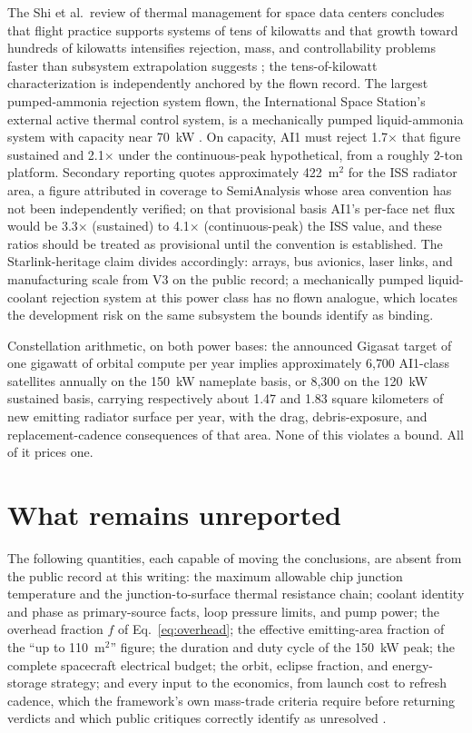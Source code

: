 \documentclass[11pt]{article}
\begin{document}
The Shi et al.\ review of thermal management for space data centers concludes that flight practice supports systems of tens of kilowatts and that growth toward hundreds of kilowatts intensifies rejection, mass, and controllability problems faster than subsystem extrapolation suggests \cite{shi2026}; the tens-of-kilowatt characterization is independently anchored by the flown record. The largest pumped-ammonia rejection system flown, the International Space Station's external active thermal control system, is a mechanically pumped liquid-ammonia system with capacity near 70~kW \cite{nasaiss}. On capacity, AI1 must reject 1.7$\times$ that figure sustained and 2.1$\times$ under the continuous-peak hypothetical, from a roughly 2-ton platform. Secondary reporting quotes approximately 422~m$^{2}$ for the ISS radiator area, a figure attributed in coverage to SemiAnalysis whose area convention has not been independently verified; on that provisional basis AI1's per-face net flux would be 3.3$\times$ (sustained) to 4.1$\times$ (continuous-peak) the ISS value, and these ratios should be treated as provisional until the convention is established. The Starlink-heritage claim \cite{dcd2026} divides accordingly: arrays, bus avionics, laser links, and manufacturing scale from V3 on the public record; a mechanically pumped liquid-coolant rejection system at this power class has no flown analogue, which locates the development risk on the same subsystem the bounds identify as binding.

Constellation arithmetic, on both power bases: the announced Gigasat target of one gigawatt of orbital compute per year \cite{tomsgigasat2026} implies approximately 6{,}700 AI1-class satellites annually on the 150~kW nameplate basis, or 8{,}300 on the 120~kW sustained basis, carrying respectively about 1.47 and 1.83 square kilometers of new emitting radiator surface per year, with the drag, debris-exposure, and replacement-cadence consequences of that area. None of this violates a bound. All of it prices one.

\section{What remains unreported}\label{sec:open}

The following quantities, each capable of moving the conclusions, are absent from the public record at this writing: the maximum allowable chip junction temperature and the junction-to-surface thermal resistance chain; coolant identity and phase as primary-source facts, loop pressure limits, and pump power; the overhead fraction $f$ of Eq.~\eqref{eq:overhead}; the effective emitting-area fraction of the ``up to 110~m$^{2}$'' figure; the duration and duty cycle of the 150~kW peak; the complete spacecraft electrical budget; the orbit, eclipse fraction, and energy-storage strategy; and every input to the economics, from launch cost to refresh cadence, which the framework's own mass-trade criteria require before returning verdicts and which public critiques correctly identify as unresolved \cite{techtimes2026}.
\end{document}
